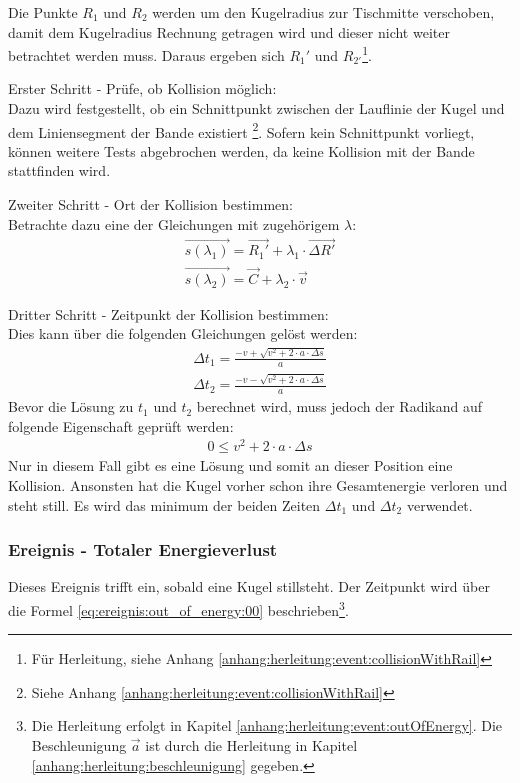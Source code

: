 Die Punkte $R_1$ und $R_2$ werden um den Kugelradius zur Tischmitte verschoben,
damit dem Kugelradius Rechnung getragen wird und dieser nicht weiter betrachtet werden muss.
Daraus ergeben sich $R_1'$ und $R_{2'}$\footnote{Für Herleitung, siehe Anhang \ref{anhang:herleitung:event:collisionWithRail}}.

Erster Schritt - Prüfe, ob Kollision möglich:\\
Dazu wird festgestellt, ob ein Schnittpunkt zwischen der Lauflinie der Kugel und dem Liniensegment der
Bande existiert \footnote{Siehe Anhang \ref{anhang:herleitung:event:collisionWithRail}}.
Sofern kein Schnittpunkt vorliegt, können weitere Tests abgebrochen werden, da keine Kollision mit der Bande stattfinden wird.

Zweiter Schritt - Ort der Kollision bestimmen:\\
Betrachte dazu eine der Gleichungen mit zugehörigem $\lambda$:
\begin{align}
    \vec{s(\lambda_1)} = \vec{R_1'} + \lambda_1 \cdot \vec{\Delta R'}\\
    \vec{s(\lambda_2)} = \vec{C} + \lambda_2 \cdot \vec{v}
\end{align}

Dritter Schritt - Zeitpunkt der Kollision bestimmen:\\
Dies kann über die folgenden Gleichungen gelöst werden:
\begin{align}
    \Delta t_1 = \frac{-v + \sqrt{v^2 + 2 \cdot a \cdot \Delta s}}{a}\\
    \Delta t_2 = \frac{-v - \sqrt{v^2 + 2 \cdot a \cdot \Delta s}}{a}
\end{align}
Bevor die Lösung zu $t_1$ und $t_2$ berechnet wird, muss jedoch der Radikand auf folgende Eigenschaft geprüft werden:
\begin{align}
    0 \leq v^2 + 2 \cdot a \cdot \Delta s
\end{align}
Nur in diesem Fall gibt es eine Lösung und somit an dieser Position eine Kollision. Ansonsten hat die Kugel vorher schon
ihre Gesamtenergie verloren und steht still. Es wird das minimum der beiden Zeiten $\Delta t_1$ und $\Delta t_2$ verwendet.

\subsubsection{Ereignis - Totaler Energieverlust}
Dieses Ereignis trifft ein, sobald eine Kugel stillsteht. Der Zeitpunkt wird über die Formel \ref{eq:ereignis:out_of_energy:00}
beschrieben\footnote{Die Herleitung erfolgt in Kapitel \ref{anhang:herleitung:event:outOfEnergy}.
Die Beschleunigung $\vec{a}$ ist durch die Herleitung in Kapitel \ref{anhang:herleitung:beschleunigung}
gegeben.}.

